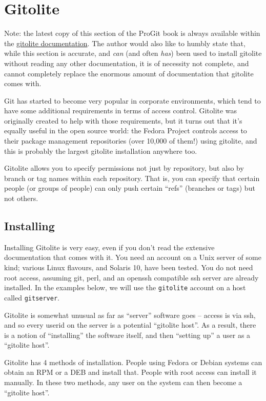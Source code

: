 \documentclass[a4paper]{book}
\begin{document}
\section{Gitolite}

Note: the latest copy of this section of the ProGit book is always available within the \href{http://github.com/sitaramc/gitolite/blob/pu/doc/progit-article.mkd}{gitolite documentation}. The author would also like to humbly state that, while this section is accurate, and \emph{can} (and often \emph{has}) been used to install gitolite without reading any other documentation, it is of necessity not complete, and cannot completely replace the enormous amount of documentation that gitolite comes with.

Git has started to become very popular in corporate environments, which tend to have some additional requirements in terms of access control. Gitolite was originally created to help with those requirements, but it turns out that it's equally useful in the open source world: the Fedora Project controls access to their package management repositories (over 10,000 of them!) using gitolite, and this is probably the largest gitolite installation anywhere too.

Gitolite allows you to specify permissions not just by repository, but also by branch or tag names within each repository. That is, you can specify that certain people (or groups of people) can only push certain “refs” (branches or tags) but not others.

\subsection{Installing}

Installing Gitolite is very easy, even if you don't read the extensive documentation that comes with it. You need an account on a Unix server of some kind; various Linux flavours, and Solaris 10, have been tested. You do not need root access, assuming git, perl, and an openssh compatible ssh server are already installed. In the examples below, we will use the \texttt{gitolite} account on a host called \texttt{gitserver}.

Gitolite is somewhat unusual as far as “server” software goes -- access is via ssh, and so every userid on the server is a potential “gitolite host”. As a result, there is a notion of “installing” the software itself, and then “setting up” a user as a “gitolite host”.

Gitolite has 4 methods of installation. People using Fedora or Debian systems can obtain an RPM or a DEB and install that. People with root access can install it manually. In these two methods, any user on the system can then become a “gitolite host”.
\end{document}
